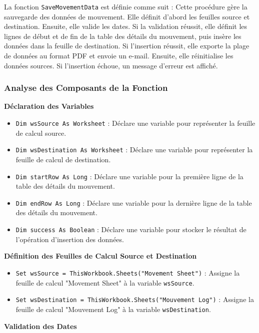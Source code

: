 \documentclass[a4paper, oneside, 12pt, final]{extreport}
\begin{document}
La fonction \texttt{SaveMovementData} est définie comme suit :
Cette procédure gère la sauvegarde des données de mouvement. Elle définit d'abord les feuilles source et destination. Ensuite, elle valide les dates. Si la validation réussit, elle définit les lignes de début et de fin de la table des détails du mouvement, puis insère les données dans la feuille de destination. Si l'insertion réussit, elle exporte la plage de données au format PDF et envoie un e-mail. Ensuite, elle réinitialise les données sources. Si l'insertion échoue, un message d'erreur est affiché.

\subsubsection{Analyse des Composants de la Fonction}

\textbf{Déclaration des Variables}

\begin{itemize}
    \item \texttt{Dim wsSource As Worksheet} : Déclare une variable pour représenter la feuille de calcul source.
    \item \texttt{Dim wsDestination As Worksheet} : Déclare une variable pour représenter la feuille de calcul de destination.
    \item \texttt{Dim startRow As Long} : Déclare une variable pour la première ligne de la table des détails du mouvement.
    \item \texttt{Dim endRow As Long} : Déclare une variable pour la dernière ligne de la table des détails du mouvement.
    \item \texttt{Dim success As Boolean} : Déclare une variable pour stocker le résultat de l'opération d'insertion des données.
\end{itemize}

\textbf{Définition des Feuilles de Calcul Source et Destination}

\begin{itemize}
    \item \texttt{Set wsSource = ThisWorkbook.Sheets("Movement Sheet")} : Assigne la feuille de calcul "Movement Sheet" à la variable \texttt{wsSource}.
    \item \texttt{Set wsDestination = ThisWorkbook.Sheets("Mouvement Log")} : Assigne la feuille de calcul "Mouvement Log" à la variable \texttt{wsDestination}.
\end{itemize}

\textbf{Validation des Dates}
\end{document}

